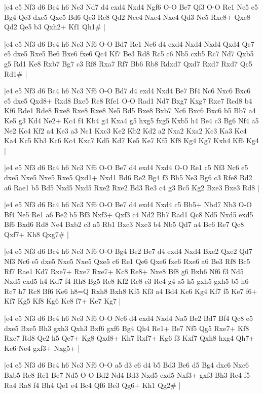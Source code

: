 \whitename{}
\blackname{}
\makegametitle
|e4 e5 Nf3 d6 Bc4 h6 Nc3 Nd7 d4 exd4 Nxd4 Ngf6 O-O Be7 Qf3 O-O Re1 Nc5 e5 Bg4 Qe3 dxe5 Qxe5 Bd6 Qe3 Re8 Qd2 Nce4 Nxe4 Nxe4 Qd3 Nc5 Rxe8+ Qxe8 Qd2 Qe5 b3 Qxh2+ Kf1 Qh1\#  |

\whitename{}
\blackname{}
\makegametitle
|e4 e5 Nf3 d6 Bc4 h6 Nc3 Nf6 O-O Bd7 Re1 Nc6 d4 exd4 Nxd4 Nxd4 Qxd4 Qe7 e5 dxe5 Rxe5 Be6 Bxe6 fxe6 Qc4 Kf7 Be3 Rd8 Rc5 c6 Nb5 cxb5 Rc7 Nd7 Qxb5 g5 Rd1 Ke8 Rxb7 Bg7 c3 Rf8 Rxa7 Rf7 Bb6 Rb8 Rdxd7 Qxd7 Rxd7 Rxd7 Qc5 Rd1\#  |

\whitename{}
\blackname{}
\makegametitle
|e4 e5 Nf3 d6 Bc4 h6 Nc3 Nf6 O-O Bd7 d4 exd4 Nxd4 Be7 Bf4 Nc6 Nxc6 Bxc6 e5 dxe5 Qxd8+ Rxd8 Bxe5 Rc8 Rfe1 O-O Rad1 Nd7 Bxg7 Kxg7 Rxe7 Rcd8 b4 Kf6 Rde1 Rde8 Rxe8 Rxe8 Rxe8 Ne5 Bd5 Bxe8 Bxb7 Nc6 Bxc6 Bxc6 b5 Bb7 a4 Ke5 g3 Kd4 Ne2+ Kc4 f4 Kb4 g4 Kxa4 g5 hxg5 fxg5 Kxb5 h4 Be4 c3 Bg6 Nf4 a5 Ne2 Kc4 Kf2 a4 Ke3 a3 Nc1 Kxc3 Ke2 Kb2 Kd2 a2 Nxa2 Kxa2 Kc3 Ka3 Kc4 Ka4 Kc5 Kb3 Kc6 Kc4 Kxc7 Kd5 Kd7 Ke5 Ke7 Kf5 Kf8 Kg4 Kg7 Kxh4 Kf6 Kg4  |

\whitename{}
\blackname{}
\makegametitle
|e4 e5 Nf3 d6 Bc4 h6 Nc3 Nf6 O-O Be7 d4 exd4 Nxd4 O-O Re1 c5 Nf3 Nc6 e5 dxe5 Nxe5 Nxe5 Rxe5 Qxd1+ Nxd1 Bd6 Re2 Bg4 f3 Bh5 Ne3 Bg6 c3 Rfe8 Bd2 a6 Rae1 b5 Bd5 Nxd5 Nxd5 Rxe2 Rxe2 Bd3 Re3 c4 g3 Bc5 Kg2 Bxe3 Bxe3 Rd8  |

\whitename{}
\blackname{}
\makegametitle
|e4 e5 Nf3 d6 Bc4 h6 Nc3 Nf6 O-O Be7 d4 exd4 Nxd4 c5 Bb5+ Nbd7 Nb3 O-O Bf4 Ne5 Re1 a6 Be2 b5 Bf3 Nxf3+ Qxf3 c4 Nd2 Bb7 Rad1 Qc8 Nd5 Nxd5 exd5 Bf6 Bxd6 Rd8 Ne4 Bxb2 c3 a5 Rb1 Bxc3 Nxc3 b4 Nb5 Qd7 a4 Bc6 Re7 Qc8 Qxf7+ Kh8 Qxg7\#  |

\whitename{}
\blackname{}
\makegametitle
|e4 e5 Nf3 d6 Bc4 h6 Nc3 Nf6 O-O Bg4 Be2 Be7 d4 exd4 Nxd4 Bxe2 Qxe2 Qd7 Nf3 Nc6 e5 dxe5 Nxe5 Nxe5 Qxe5 c6 Re1 Qe6 Qxe6 fxe6 Rxe6 a6 Be3 Rf8 Bc5 Rf7 Rae1 Kd7 Rxe7+ Rxe7 Rxe7+ Kc8 Re8+ Nxe8 Bf8 g6 Bxh6 Nf6 f3 Nd5 Nxd5 cxd5 h4 Kd7 f4 Rh8 Bg5 Re8 Kf2 Rc8 c3 Rc4 g4 a5 h5 gxh5 gxh5 b5 h6 Rc7 h7 Rc8 Bf6 Ke6 h8=Q Rxh8 Bxh8 Kf5 Kf3 a4 Bd4 Ke6 Kg4 Kf7 f5 Ke7 f6+ Kf7 Kg5 Kf8 Kg6 Ke8 f7+ Ke7 Kg7  |

\whitename{}
\blackname{}
\makegametitle
|e4 e5 Nf3 d6 Bc4 h6 Nc3 Nf6 O-O Nc6 d4 exd4 Nxd4 Na5 Be2 Bd7 Bf4 Qc8 e5 dxe5 Bxe5 Bh3 gxh3 Qxh3 Bxf6 gxf6 Bg4 Qh4 Re1+ Be7 Nf5 Qg5 Rxe7+ Kf8 Rxc7 Rd8 Qe2 h5 Qe7+ Kg8 Qxd8+ Kh7 Rxf7+ Kg6 f3 Kxf7 Qxh8 hxg4 Qh7+ Ke6 Ne4 gxf3+ Nxg5+  |

\whitename{}
\blackname{}
\makegametitle
|e4 e5 Nf3 d6 Bc4 h6 Nc3 Nf6 O-O a5 d3 c6 d4 b5 Bd3 Be6 d5 Bg4 dxc6 Nxc6 Bxb5 Rc8 Re1 Be7 Nd5 O-O Bd2 Nd4 Bd3 Nxd5 exd5 Nxf3+ gxf3 Bh3 Re4 f5 Ra4 Ra8 f4 Bh4 Qe1 e4 Bc4 Qf6 Bc3 Qg6+ Kh1 Qg2\#  |

